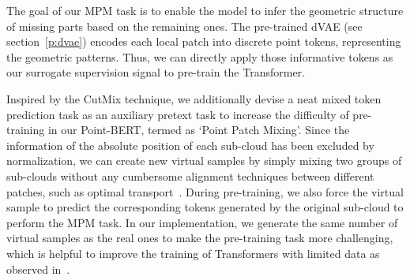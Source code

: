 The goal of our MPM task is to enable the model to infer the geometric structure of missing parts based on the remaining ones.  The pre-trained dVAE (see section~\ref{p:dvae})  encodes each local patch into discrete point tokens,  representing the geometric patterns. Thus, we can directly apply those informative tokens as our surrogate supervision signal to pre-train the Transformer. 
 
  Inspired by the CutMix\cite{cutmix,pointcutmix} technique, we additionally devise a neat mixed token prediction task as an auxiliary pretext task to increase the difficulty of pre-training in our Point-BERT, termed as `Point Patch Mixing'. Since the information of the absolute position of each sub-cloud has been excluded by normalization, we can create new virtual samples by simply mixing two groups of sub-clouds without any cumbersome alignment techniques between different patches, such as optimal transport~\cite{pointcutmix}. During pre-training, we also force the virtual sample to predict the corresponding tokens generated by the original sub-cloud to perform the MPM task. In our implementation, we generate the same number of virtual samples as the real ones to make the pre-training task more challenging, which is helpful to improve the training of Transformers with limited data as observed in~\cite{touvron2021training}.
	
